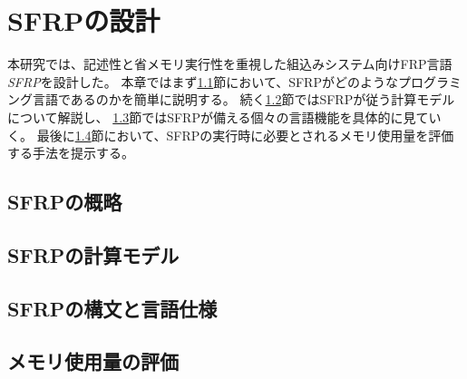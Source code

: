 \chapter{SFRPの設計}\label{sec:language}
本研究では、記述性と省メモリ実行性を重視した組込みシステム向けFRP言語{\it SFRP}を設計した。
本章ではまず\ref{sec:language:abstract}節において、SFRPがどのようなプログラミング言語であるのかを簡単に説明する。
続く\ref{sec:language:model}節ではSFRPが従う計算モデルについて解説し、
\ref{sec:language:syntax}節ではSFRPが備える個々の言語機能を具体的に見ていく。
最後に\ref{sec:language:memory}節において、SFRPの実行時に必要とされるメモリ使用量を評価する手法を提示する。

\section{SFRPの概略}\label{sec:language:abstract}


\section{SFRPの計算モデル}\label{sec:language:model}


\section{SFRPの構文と言語仕様}\label{sec:language:syntax}


\section{メモリ使用量の評価}\label{sec:language:memory}

